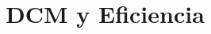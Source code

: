 \documentclass[e4_tp1_main.tex]{subfiles}
\begin{document}
\section{DCM y Eficiencia}
\newpage
\end{document}
